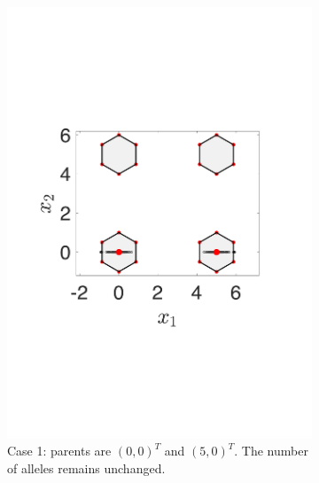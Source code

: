 \documentclass[conference]{IEEEtran}
\begin{document}
\begin{figure}[htbp]
	\centering
	\begin{subfigure}[b]{.24\textwidth}
		\includegraphics[width=\linewidth]{Section3/crossover1}
		\caption{Case 1: parents are $(0, 0)^T$ and $(5, 0)^T$. The number of alleles remains unchanged.}
		\label{fig: SBX crossover case 1}
	\end{subfigure}
	\begin{subfigure}[b]{.24\textwidth}

\end{subfigure}
\end{figure}
\end{document}
